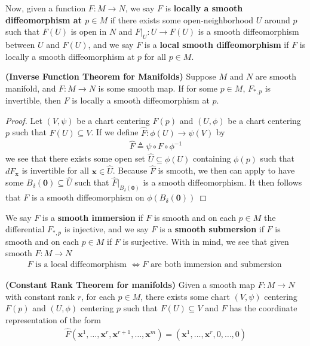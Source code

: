 \documentclass{report}
\begin{document}
\begin{mdframed}
Now, given a function $F:M\rightarrow N$, we say $F$ is \textbf{locally a smooth diffeomorphism at $p\in M$} if there exists some open-neighborhood $U$ around $p$ such that $F(U)$ is open in $N$ and $F|_U:U\rightarrow F(U)$ is a smooth diffeomorphism between $U$ and $F(U)$, and we say $F$ is a \textbf{local  smooth diffeomorphism} if $F$ is locally a smooth diffeomorphism at $p$ for all $p\in  M$. 
\end{mdframed}
\begin{theorem}
\label{Inverse Function Theorem for Manifolds}
\textbf{(Inverse Function Theorem for Manifolds)} Suppose $M$ and $N$ are smooth manifold, and  $F:M\rightarrow N$ is some smooth map. If for some $p\in  M$, $F_{*,p}$ is invertible, then $F$ is locally a smooth diffeomorphism at $p$. 
\end{theorem}
\begin{proof}
Let  $(V,\psi)$ be a chart centering $F(p)$ and $(U,\phi)$ be a chart centering $p$ such that  $F(U)\subseteq V$. If we define $\widehat{F}:\phi (U)\rightarrow \psi (V)$ by 
\begin{align*}
\widehat{F}\triangleq \psi \circ F\circ \phi^{-1}
\end{align*}
we see that there exists some open set $\widehat{U}\subseteq \phi (U)$ containing  $\phi (p)$ such that $dF_\textbf{x}$ is invertible for all $\textbf{x}\in \widehat{U}$. Because $\widehat{F}$ is smooth, we then can apply  to have some $B_{\delta}(\textbf{0})\subseteq \widehat{U}$ such that $\widehat{F}|_{B_\delta(\textbf{0})}$ is a smooth diffeomorphism. It then follows that $F$ is a smooth diffeomorphism on  $\phi (B_\delta (\textbf{0}))$
\end{proof}
\begin{mdframed}
We say $F$ is a \textbf{smooth immersion} if $F$ is smooth and on each $p\in  M$ the differential $F_{*,p}$ is injective, and we say $F$ is a \textbf{smooth submersion} if $F$ is smooth and on each $p\in  M$ if $F$ is surjective. With   in mind, we see that given smooth $F:M\rightarrow N$ 
\begin{align*}
F\text{ is a local diffeomorphism }\iff F\text{ are both immersion and submersion }
\end{align*}
\end{mdframed}
\begin{theorem}
\label{Rank Theorem for Manifolds}
\textbf{(Constant Rank Theorem for manifolds)} Given a smooth map $F:M\rightarrow N$ with constant rank $r$, for each  $p\in  M$, there exists some chart $(V,\psi)$  centering $F(p)$ and $(U,\phi)$ centering $p$ such that  $F(U)\subseteq V$ and $F$ has the coordinate representation of the form 
\begin{align*}
\widehat{F}(\textbf{x}^1,\dots ,\textbf{x}^r,\textbf{x}^{r+1},\dots ,\textbf{x}^m)=(\textbf{x}^1, \dots ,\textbf{x}^r, 0,\dots ,0)
\end{align*}
\end{theorem}
\end{document}
